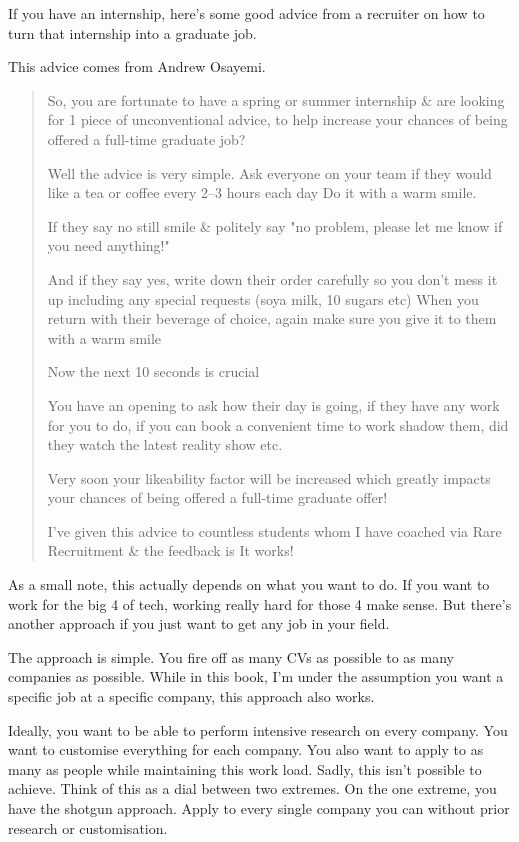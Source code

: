 \documentclass{article}
\begin{document}
If you have an internship, here's some good advice from a recruiter on
how to turn that internship into a graduate job.

This advice comes from Andrew Osayemi.

\begin{quote}
So, you are fortunate to have a spring or summer internship \& are
looking for 1 piece of unconventional advice, to help increase your
chances of being offered a full-time graduate job?

Well the advice is very simple. Ask everyone on your team if they
would like a tea or coffee every 2--3 hours each day
Do it with a warm smile.

If they say no still smile \& politely say "no problem, please let
me know if you need anything!"

And if they say yes, write down their order carefully so you don't mess
it up including any special requests (soya milk, 10 sugars etc)
When you return with their beverage of choice, again make sure you give
it to them with a warm smile

Now the next 10 seconds is crucial

You have an opening to ask how their day is going, if they have any work
for you to do, if you can book a convenient time to work shadow them,
did they watch the latest reality show etc.

Very soon your likeability factor will be increased which greatly
impacts your chances of being offered a full-time graduate offer!

I've given this advice to countless students whom I have coached via
Rare Recruitment \& the feedback is It works!
\end{quote}

As a small note, this actually depends on what you want to do. If you
want to work for the big 4 of tech, working really hard for those 4 make
sense. But there's another approach if you just want to get any job in
your field.

The approach is simple. You fire off as many CVs as possible to as many
companies as possible. While in this book, I'm under the assumption you
want a specific job at a specific company, this approach also works.

Ideally, you want to be able to perform intensive research on every
company. You want to customise everything for each company. You also
want to apply to as many as people while maintaining this work load.
Sadly, this isn't possible to achieve. Think of this as a dial between
two extremes. On the one extreme, you have the shotgun approach. Apply
to every single company you can without prior research or customisation.
\end{document}
